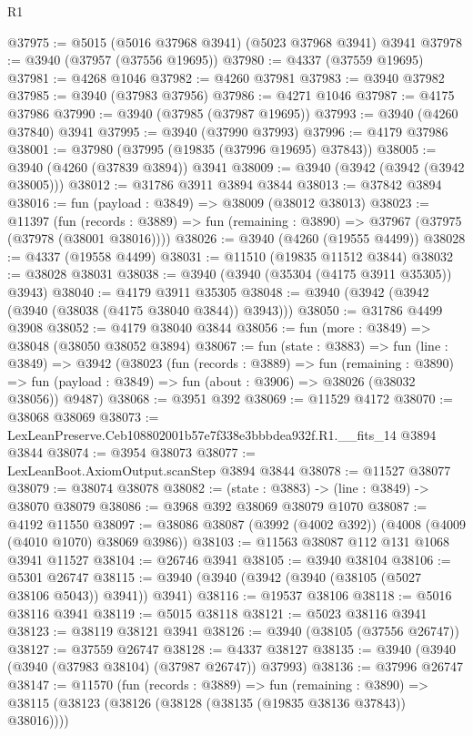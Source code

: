 \begin{lexlean}{R1}
\begin{coremodule}
@37975 := @5015 (@5016 @37968 @3941) (@5023 @37968 @3941) @3941
@37978 := @3940 (@37957 (@37556 @19695))
@37980 := @4337 (@37559 @19695)
@37981 := @4268 @1046
@37982 := @4260 @37981
@37983 := @3940 @37982
@37985 := @3940 (@37983 @37956)
@37986 := @4271 @1046
@37987 := @4175 @37986
@37990 := @3940 (@37985 (@37987 @19695))
@37993 := @3940 (@4260 @37840) @3941
@37995 := @3940 (@37990 @37993)
@37996 := @4179 @37986
@38001 := @37980 (@37995 (@19835 (@37996 @19695) @37843))
@38005 := @3940 (@4260 (@37839 @3894)) @3941
@38009 := @3940 (@3942 (@3942 (@3942 @38005)))
@38012 := @31786 @3911 @3894 @3844
@38013 := @37842 @3894
@38016 := fun (payload : @3849) => @38009 (@38012 @38013)
@38023 := @11397
    (fun (records : @3889) => fun (remaining : @3890) => @37967 (@37975 (@37978 (@38001 @38016))))
@38026 := @3940 (@4260 (@19555 @4499))
@38028 := @4337 (@19558 @4499)
@38031 := @11510 (@19835 @11512 @3844)
@38032 := @38028 @38031
@38038 := @3940 (@3940 (@35304 (@4175 @3911 @35305)) @3943)
@38040 := @4179 @3911 @35305
@38048 := @3940 (@3942 (@3942 (@3940 (@38038 (@4175 @38040 @3844)) @3943)))
@38050 := @31786 @4499 @3908
@38052 := @4179 @38040 @3844
@38056 := fun (more : @3849) => @38048 (@38050 @38052 @3894)
@38067 := fun (state : @3883) =>
  fun (line : @3849) =>
  @3942
    (@38023
      (fun (records : @3889) =>
      fun (remaining : @3890) =>
      fun (payload : @3849) => fun (about : @3906) => @38026 (@38032 @38056))
      @9487)
@38068 := @3951 @392
@38069 := @11529 @4172
@38070 := @38068 @38069
@38073 := LexLeanPreserve.Ceb108802001b57e7f338e3bbbdea932f.R1.__fits_14 @3894 @3844
@38074 := @3954 @38073
@38077 := LexLeanBoot.AxiomOutput.scanStep @3894 @3844
@38078 := @11527 @38077
@38079 := @38074 @38078
@38082 := (state : @3883) -> (line : @3849) -> @38070 @38079
@38086 := @3968 @392 @38069 @38079 @1070
@38087 := @4192 @11550
@38097 := @38086 @38087 (@3992 (@4002 @392)) (@4008 (@4009 (@4010 @1070) @38069 @3986))
@38103 := @11563 @38087 @112 @131 @1068 @3941 @11527
@38104 := @26746 @3941
@38105 := @3940 @38104
@38106 := @5301 @26747
@38115 := @3940 (@3940 (@3942 (@3940 (@38105 (@5027 @38106 @5043)) @3941)) @3941)
@38116 := @19537 @38106
@38118 := @5016 @38116 @3941
@38119 := @5015 @38118
@38121 := @5023 @38116 @3941
@38123 := @38119 @38121 @3941
@38126 := @3940 (@38105 (@37556 @26747))
@38127 := @37559 @26747
@38128 := @4337 @38127
@38135 := @3940 (@3940 (@3940 (@37983 @38104) (@37987 @26747)) @37993)
@38136 := @37996 @26747
@38147 := @11570
    (fun (records : @3889) =>
    fun (remaining : @3890) =>
    @38115 (@38123 (@38126 (@38128 (@38135 (@19835 @38136 @37843)) @38016))))

\end{coremodule}
\end{lexlean}
